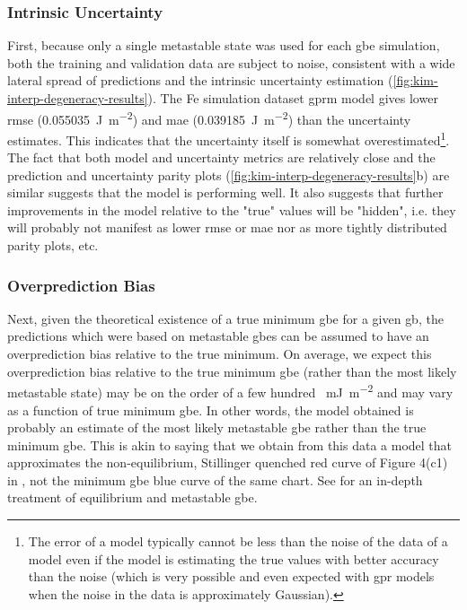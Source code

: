 \documentclass[final,twocolumn,12pt]{elsarticle}
\begin{document}
    \subsubsection{Intrinsic Uncertainty} \label{sec:discuss:lit:error}
	First, because only a single metastable state was used for each \gls{gbe} simulation, both the training and validation data are subject to noise, consistent with a wide lateral spread of predictions and the intrinsic uncertainty estimation (\cref{fig:kim-interp-degeneracy-results}). The Fe simulation dataset \gls{gprm} model gives lower \gls{rmse} (\SI{0.055035}{\joule\per\square\meter}) and \gls{mae} (\SI{0.039185}{\joule\per\square\meter}) than the uncertainty estimates. This indicates that the uncertainty itself is somewhat overestimated\footnote{The \outpt{} error of a model typically cannot be less than the noise of the \outpt{} data of a model even if the model is estimating the true \outpt{} values with better accuracy than the noise (which is very possible and even expected with \gls{gpr} models when the noise in the \inpt{} data is approximately Gaussian).}. The fact that both model and uncertainty metrics are relatively close and the prediction \cite{bairdFiveDegreeofFreedomPropertyUnderReview} and uncertainty parity plots (\cref{fig:kim-interp-degeneracy-results}b) are similar suggests that the model is performing well. It also suggests that further improvements in the model relative to the "true" values will be "hidden", i.e. they will probably not manifest as lower \gls{rmse} or \gls{mae} nor as more tightly distributed parity plots, etc.
	
	\subsubsection{Overprediction Bias} \label{sec:discuss:lit:overprediction}
	Next, given the theoretical existence of a true minimum \gls{gbe} for a given \gls{gb}, the predictions which were based on metastable \glspl{gbe} can be assumed to have an overprediction bias relative to the true minimum. On average, we expect this overprediction bias relative to the true minimum \gls{gbe} (rather than the most likely metastable state) may be on the order of a few hundred \SI{}{\milli\J\per\square\m} and may vary as a function of true minimum \gls{gbe}. In other words, the model obtained is probably an estimate of the most likely metastable \gls{gbe} rather than the true minimum \gls{gbe}. This is akin to saying that we obtain from this data a model that approximates the non-equilibrium, Stillinger quenched red curve of Figure 4(c1) in \cite{hanGrainboundaryMetastabilityIts2016}, not the minimum \gls{gbe} blue curve of the same chart. See \cite{hanGrainboundaryMetastabilityIts2016} for an in-depth treatment of equilibrium and metastable \gls{gbe}.
	
\end{document}
